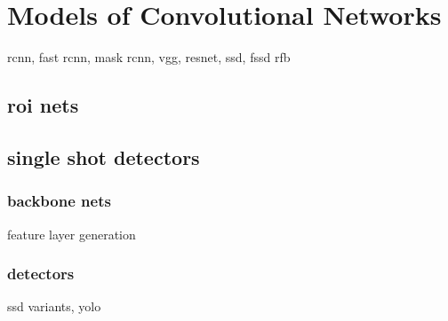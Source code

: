\chapter{Models of Convolutional Networks}
\label{chapt:models}

rcnn, fast rcnn, mask rcnn, vgg, resnet, ssd, fssd rfb

\section{roi nets}

\section{single shot detectors}
\subsection{backbone nets}
feature layer generation

\subsection{detectors}
ssd variants, yolo

